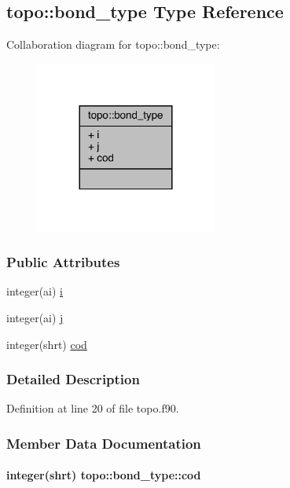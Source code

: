 \hypertarget{structtopo_1_1bond__type}{\subsection{topo\-:\-:bond\-\_\-type Type Reference}
\label{structtopo_1_1bond__type}
}


Collaboration diagram for topo\-:\-:bond\-\_\-type\-:
\nopagebreak
\begin{figure}[H]
\begin{center}
\leavevmode
\includegraphics[width=168pt]{structtopo_1_1bond__type__coll__graph}
\end{center}
\end{figure}
\subsubsection*{Public Attributes}
\begin{DoxyCompactItemize}
\item 
integer(ai) \hyperlink{structtopo_1_1bond__type_a9fb0e794b5bd24e3774b8d6963183d87}{i}
\item 
integer(ai) \hyperlink{structtopo_1_1bond__type_a49cfa20c7f21fc0af62e369b98e1bb04}{j}
\item 
integer(shrt) \hyperlink{structtopo_1_1bond__type_ae229179378ca90eaabaea3c96d2b8ae3}{cod}
\end{DoxyCompactItemize}


\subsubsection{Detailed Description}


Definition at line 20 of file topo.\-f90.



\subsubsection{Member Data Documentation}
\hypertarget{structtopo_1_1bond__type_ae229179378ca90eaabaea3c96d2b8ae3}{
\paragraph[{cod}]{\setlength{\rightskip}{0pt plus 5cm}integer(shrt) topo\-::bond\-\_\-type\-::cod}}\label{structtopo_1_1bond__type_ae229179378ca90eaabaea3c96d2b8ae3}


